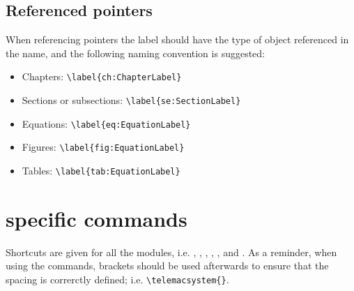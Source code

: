 \subsection{Referenced pointers}

When referencing pointers the label should have the type of object referenced in the name, and the following naming convention is suggested:

\begin{itemize}
\item Chapters: \verb+\label{ch:ChapterLabel}+
\item Sections or subsections: \verb+\label{se:SectionLabel}+
\item Equations: \verb+\label{eq:EquationLabel}+
\item Figures: \verb+\label{fig:EquationLabel}+
\item Tables: \verb+\label{tab:EquationLabel}+
\end{itemize}


\section{\texorpdfstring{\telemacsystem{}}{Telemac} specific commands}

Shortcuts are given for all the modules, i.e. \telemacsystem{}, \artemis{}, \bief{}, \sisyphe{}, ,  and \tomawac{}. As a
reminder, when using the commands, brackets should be used afterwards to ensure that the spacing is correrctly defined; i.e. \verb+\telemacsystem{}+.


